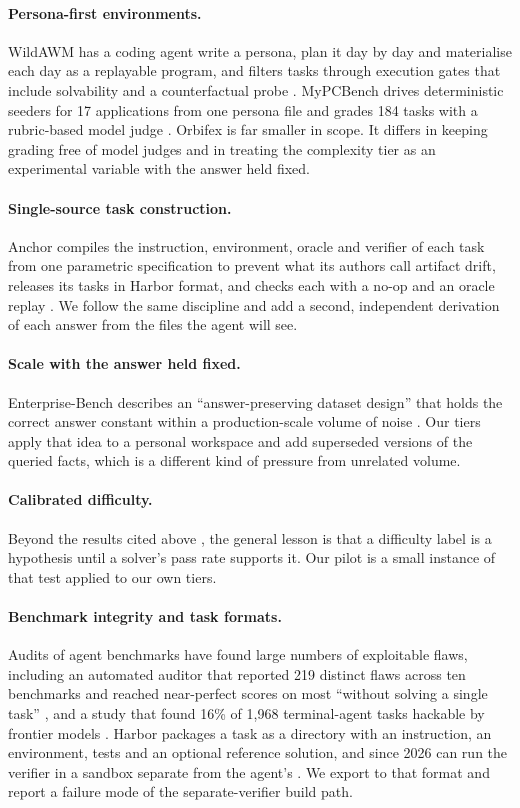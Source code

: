 \documentclass{article}
\begin{document}
\paragraph{Persona-first environments.} WildAWM has a coding agent write a persona, plan it day by day and materialise each day as a replayable program, and filters tasks through execution gates that include solvability and a counterfactual probe \cite{wildawm}. MyPCBench drives deterministic seeders for 17 applications from one persona file and grades 184 tasks with a rubric-based model judge \cite{mypcbench}. Orbifex is far smaller in scope. It differs in keeping grading free of model judges and in treating the complexity tier as an experimental variable with the answer held fixed.

\paragraph{Single-source task construction.} Anchor compiles the instruction, environment, oracle and verifier of each task from one parametric specification to prevent what its authors call artifact drift, releases its tasks in Harbor format, and checks each with a no-op and an oracle replay \cite{anchor}. We follow the same discipline and add a second, independent derivation of each answer from the files the agent will see.

\paragraph{Scale with the answer held fixed.} Enterprise-Bench describes an ``answer-preserving dataset design'' that holds the correct answer constant within a production-scale volume of noise \cite{enterprisebench}. Our tiers apply that idea to a personal workspace and add superseded versions of the queried facts, which is a different kind of pressure from unrelated volume.

\paragraph{Calibrated difficulty.} Beyond the results cited above \cite{emailbench,generalagent,grads}, the general lesson is that a difficulty label is a hypothesis until a solver's pass rate supports it. Our pilot is a small instance of that test applied to our own tiers.

\paragraph{Benchmark integrity and task formats.} Audits of agent benchmarks have found large numbers of exploitable flaws, including an automated auditor that reported 219 distinct flaws across ten benchmarks and reached near-perfect scores on most ``without solving a single task'' \cite{benchjack}, and a study that found 16\% of 1{,}968 terminal-agent tasks hackable by frontier models \cite{hackerfixer}. Harbor packages a task as a directory with an instruction, an environment, tests and an optional reference solution, and since 2026 can run the verifier in a sandbox separate from the agent's \cite{harbor}. We export to that format and report a failure mode of the separate-verifier build path.
\end{document}
